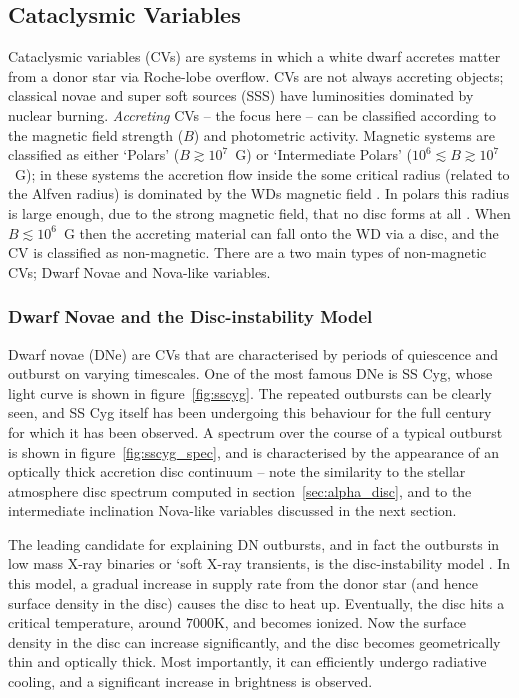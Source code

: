 \subsection{Cataclysmic Variables}

Cataclysmic variables (CVs) are systems in which a white dwarf
accretes matter from a donor star via Roche-lobe overflow. 
CVs are not always accreting objects; classical novae and super soft sources 
(SSS) have luminosities dominated by nuclear burning.
{\em Accreting} CVs -- the focus here -- can be classified according to the 
magnetic field strength ($B$) and photometric activity. 
Magnetic systems are classified as either `Polars' ($B \gtrsim 10^7$~G)
or `Intermediate Polars' ($10^6 \lesssim B \gtrsim 10^7$~G);
in these systems the accretion flow inside the some critical radius 
(related to the Alfven radius)
is dominated by the WDs magnetic field \citep[e.g.][]{patterson1994}. 
In polars this radius is large enough, due to the strong magnetic field,
that no disc forms at all \citep{liebert1985}.
When $B \lesssim 10^6$~G then the accreting material can fall
onto the WD via a disc, and the CV is classified as non-magnetic.
There are a two main types of non-magnetic CVs; Dwarf Novae and Nova-like
variables.

\subsubsection{Dwarf Novae and the Disc-instability Model}

Dwarf novae (DNe) are CVs that are characterised 
by periods of quiescence and outburst on varying timescales. One of the 
most famous DNe is SS Cyg, whose light curve is shown in 
figure~\ref{fig:sscyg}. The repeated outbursts can be clearly seen, and
SS Cyg itself has been undergoing this behaviour for the full century 
for which it has been observed. A spectrum over the course of a 
typical outburst is shown in figure~\ref{fig:sscyg_spec}, 
and is characterised by the appearance of an optically thick
accretion disc continuum -- note the similarity to the 
stellar atmosphere disc spectrum computed in section~\ref{sec:alpha_disc},
and to the intermediate inclination Nova-like variables discussed in the next
section.

The leading candidate for explaining DN outbursts, and in fact the outbursts
in low mass X-ray binaries or `soft X-ray transients,
is the disc-instability model 
\citep[DIM; see ][and references therin]{lasota2001}. 
In this model, a gradual
increase in supply rate from the donor star (and hence surface density in the disc) 
causes the disc to heat up. Eventually, the disc hits a critical temperature,
around $7000$K, and becomes ionized. Now the surface density in the disc
can increase significantly, and the disc becomes geometrically thin and
optically thick. Most importantly, it can efficiently undergo radiative
cooling, and a significant increase in brightness is observed.



